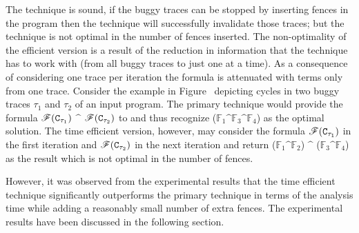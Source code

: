 The technique is sound, \ie if the buggy traces can be stopped by 
inserting \cc fences in the program then the technique will successfully
invalidate those traces;
but the technique is not optimal in the number of fences inserted.
The non-optimality of the efficient version is a result of the reduction
in information that the technique has to work with (from all buggy traces
to just one at a time). As a consequence of considering one trace per
iteration the \z formula is attenuated with terms only from one trace.
%
Consider the example in Figure~ 
depicting cycles in two buggy traces $\tau_1$ and $\tau_2$ of an 
input program. The primary \ourtechnique 
technique would provide the formula $\mathscr{F}({\tt C}_{\tau_1})$ $\^$ 
$\mathscr{F}({\tt C}_{\tau_2})$ to \z and thus recognize ($\mathbb{F}_1 \^ 
\mathbb{F}_3 \^ \mathbb{F}_4$) as the optimal solution.
The time efficient version, however, may consider the formula 
$\mathscr{F}({\tt C}_{\tau_1})$ in the first iteration and 
$\mathscr{F}({\tt C}_{\tau_2})$ in the next iteration and return
($\mathbb{F}_1 \^ \mathbb{F}_2$) $\^$ ($\mathbb{F}_3 \^ \mathbb{F}_4$) 
as the result which is not optimal in the number of fences.

However, it was observed from the experimental results that the time
efficient technique significantly outperforms the primary technique in 
terms of the analysis time while adding a reasonably small number of 
extra fences. The experimental results have been discussed in the 
following section.